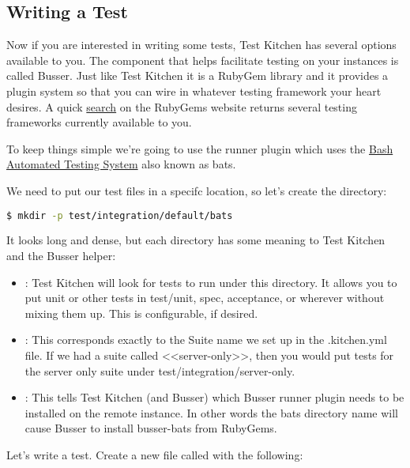 \subsection{Writing a Test}

Now if you are interested in writing some tests, Test Kitchen has several options available to you. The component that helps facilitate testing on your instances is called Busser. Just like Test Kitchen it is a RubyGem library and it provides a plugin system so that you can wire in whatever testing framework your heart desires. A quick \href{https://rubygems.org/search?utf8=%E2%9C%93&amp;query=busser-}{search} on the RubyGems website returns several testing frameworks currently available to you.

To keep things simple we're going to use the  runner plugin which uses the \href{https://github.com/sstephenson/bats}{Bash Automated Testing System} also known as bats.

We need to put our test files in a specifc location, so let's create the directory:

\begin{lstlisting}[language=Bash,label=lst:testing-test-kitchen13]
$ mkdir -p test/integration/default/bats
\end{lstlisting}

It looks long and dense, but each directory has some meaning to Test Kitchen and the Busser helper:

\begin{itemize}
  \item {}: Test Kitchen will look for tests to run under this directory. It allows you to put unit or other tests in test/unit, spec, acceptance, or wherever without mixing them up. This is configurable, if desired.
  \item {}: This corresponds exactly to the Suite name we set up in the .kitchen.yml file. If we had a suite called <<server-only>>, then you would put tests for the server only suite under test/integration/server-only.
  \item {}: This tells Test Kitchen (and Busser) which Busser runner plugin needs to be installed on the remote instance. In other words the bats directory name will cause Busser to install busser-bats from RubyGems.
\end{itemize}

Let's write a test. Create a new file called  with the following:

